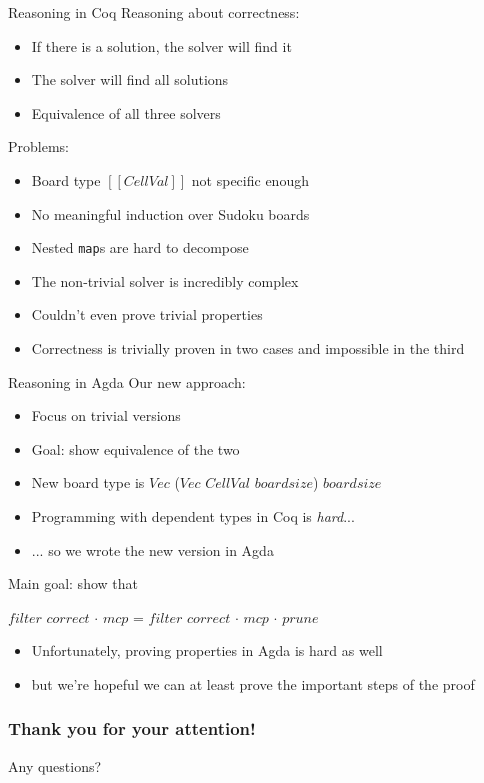 \documentclass{beamer}
\begin{document}
\begin{frame}{Reasoning in Coq}
  Reasoning about correctness:
  \begin{itemize}
    \item If there is a solution, the solver will find it
    \item The solver will find all solutions
    \item Equivalence of all three solvers
  \end{itemize}
  
  Problems:
  \begin{itemize}
    \item Board type $[[CellVal]]$ not specific enough
    \item No meaningful induction over Sudoku boards
    \item Nested \texttt{map}s are hard to decompose
    \item The non-trivial solver is incredibly complex
    \item Couldn't even prove trivial properties
    \item Correctness is trivially proven in two cases and impossible in the third
  \end{itemize}
\end{frame}

\begin{frame}{Reasoning in Agda}
  Our new approach:
  \begin{itemize}
    \item Focus on trivial versions
    \item Goal: show equivalence of the two
    \item New board type is $Vec$ ($Vec$ $CellVal$ $boardsize$) $boardsize$
    \item Programming with dependent types in Coq is \emph{hard}...
    \item ... so we wrote the new version in Agda
  \end{itemize}
  
  Main goal: show that 
  
  $filter$ $correct$ $\cdot$ $mcp$ = $filter$ $correct$ $\cdot$ $mcp$ $\cdot$ $prune$
  
  \begin{itemize}
    \item Unfortunately, proving properties in Agda is hard as well
    \item but we're hopeful we can at least prove the important steps of the proof
  \end{itemize}
\end{frame}

\begin{frame}
  \frametitle{Thank you for your attention!}
  
  Any questions?
\end{frame}


\end{document}

